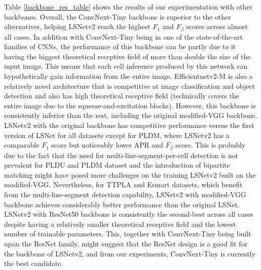 \documentclass[journal]{IEEEtran}
\begin{document}
Table \ref{backbone_res_table} shows the results of our experimentation with other backbones. Overall, the ConvNext-Tiny backbone is superior to the other alternatives, helping LSNetv2 reach the highest $F_1$ and $F_\beta$ scores across almost all cases. In addition with ConvNext-Tiny being in one of the state-of-the-art families of CNNs, the performance of this backbone can be partly due to it having the biggest theoretical receptive field of more than double the size of the input image. This means that each cell inference produced by this network can hypothetically gain information from the entire image. Efficientnetv2-M is also a relatively novel architecture that is competitive at image classification \cite{efficientnetv2} and object detection \cite{efficientdet} and also has high theoretical receptive field (technically covers the entire image due to the squeeze-and-excitation blocks). However, this backbone is consistently inferior than the rest, including the original modified-VGG backbone. LSNetv2 with the original backbone has competitive performance versus the first version of LSNet for all datasets except for PLDM, where LSNetv2 has a comparable $F_1$ score but noticeably lower APR and $F_{\beta}$ score. This is probably due to the fact that the need for multi-line-segment-per-cell detection is not prevalent for PLDU and PLDM dataset and the introduction of bipartite matching might have posed more challenges on the training LSNetv2 built on the modified-VGG. Nevertheless, for TTPLA and Esmart datasets, which benefit from the multi-line-segment detection capability, LSNetv2 with modified-VGG backbone achieves considerably better performance than the original LSNet. LSNetv2 with ResNet50 backbone is consistently the second-best across all cases despite having a relatively smaller theoretical receptive field and the lowest number of trainable parameters. This, together with ConvNext-Tiny being built upon the ResNet family, might suggest that the ResNet design is a good fit for the backbone of LSNetv2, and from our experiments, ConvNext-Tiny is currently the best candidate.
\end{document}
